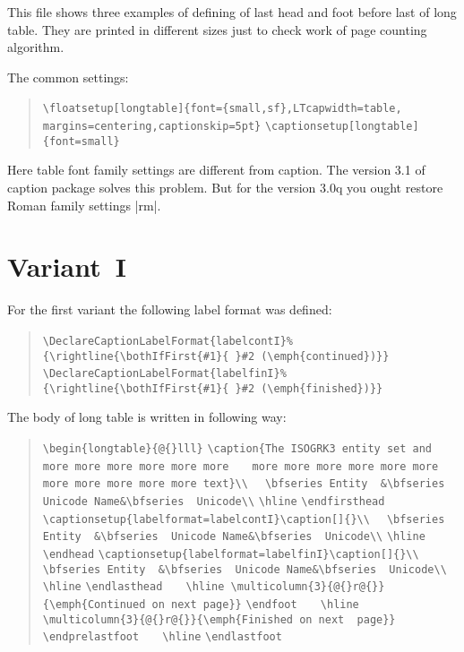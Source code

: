 This file shows three examples of defining of last head and foot before last of
long table. They are printed in different sizes just to check work of page counting
algorithm.

The common settings:
\begin{quote}\obeylines\parskip0pt
\verb|\floatsetup[longtable]{font={small,sf},LTcapwidth=table,|
\verb|    margins=centering,captionskip=5pt}|
\verb|\captionsetup[longtable]{font=small}|
\end{quote}
Here table font family settings are different from caption. The version 3.1 of 
\textsf{caption} package solves this problem.
But for the version 3.0q you ought restore Roman family settings |rm|.


\section{Variant~I}

For the first variant the following label format was defined:
\begin{quote}\obeylines\parskip0pt
\verb|\DeclareCaptionLabelFormat{labelcontI}%|
\verb|  {\rightline{\bothIfFirst{#1}{ }#2 (\emph{continued})}}|
\verb|\DeclareCaptionLabelFormat{labelfinI}%|
\verb|  {\rightline{\bothIfFirst{#1}{ }#2 (\emph{finished})}}|
\end{quote}

The body of long table is written in following way:
\begin{quote}\obeylines\parskip0pt
\verb|\begin{longtable}{@{}lll}|
\verb|\caption{The ISOGRK3 entity set and more more more more more more|
\verb|   more more more more more more more more more more more text}\\|
\verb|  \bfseries Entity  &\bfseries  Unicode Name&\bfseries  Unicode\\|
\verb|\hline|
\verb|\endfirsthead|
\verb|\captionsetup{labelformat=labelcontI}\caption[]{}\\|
\verb|  \bfseries Entity  &\bfseries  Unicode Name&\bfseries  Unicode\\|
\verb|\hline|
\verb|\endhead|
\verb|\captionsetup{labelformat=labelfinI}\caption[]{}\\|
\verb|  \bfseries Entity  &\bfseries  Unicode Name&\bfseries  Unicode\\|
\verb|\hline|
\verb|\endlasthead|
\verb|   \hline \multicolumn{3}{@{}r@{}}{\emph{Continued on next page}}|
\verb|\endfoot|
\verb|   \hline \multicolumn{3}{@{}r@{}}{\emph{Finished on next  page}}|
\verb|\endprelastfoot|
\verb|   \hline|
\verb|\endlastfoot|
\end{quote}

